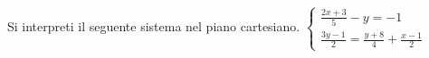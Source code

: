Si interpreti il seguente sistema nel piano cartesiano.
$\left\{ \begin{matrix}\frac{2x+3} 5-y=-1\\ \frac{3y-1} 2=\frac{y+8} 4+\frac{x-1} 2\end{matrix} \right.$
